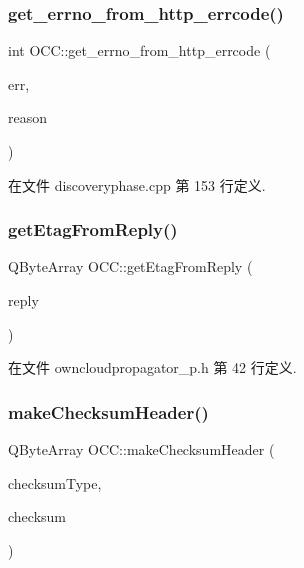 \subsubsection{\texorpdfstring{get\+\_\+errno\+\_\+from\+\_\+http\+\_\+errcode()}{get\_errno\_from\_http\_errcode()}}
{\footnotesize\ttfamily int O\+C\+C\+::get\+\_\+errno\+\_\+from\+\_\+http\+\_\+errcode (\begin{DoxyParamCaption}\item[{int}]{err,  }\item[{const Q\+String \&}]{reason }\end{DoxyParamCaption})}



在文件 discoveryphase.\+cpp 第 153 行定义.

\mbox{\label{namespace_o_c_c_a28e6c65c18ad7868703ba3f1db685a52}} 
\subsubsection{\texorpdfstring{get\+Etag\+From\+Reply()}{getEtagFromReply()}}
{\footnotesize\ttfamily Q\+Byte\+Array O\+C\+C\+::get\+Etag\+From\+Reply (\begin{DoxyParamCaption}\item[{Q\+Network\+Reply $\ast$}]{reply }\end{DoxyParamCaption})}



在文件 owncloudpropagator\+\_\+p.\+h 第 42 行定义.

\mbox{\label{namespace_o_c_c_a2f13fc062a188027ffc2939363bcb37f}} 
\subsubsection{\texorpdfstring{make\+Checksum\+Header()}{makeChecksumHeader()}}
{\footnotesize\ttfamily Q\+Byte\+Array O\+C\+C\+::make\+Checksum\+Header (\begin{DoxyParamCaption}\item[{const Q\+Byte\+Array \&}]{checksum\+Type,  }\item[{const Q\+Byte\+Array \&}]{checksum }\end{DoxyParamCaption})}



